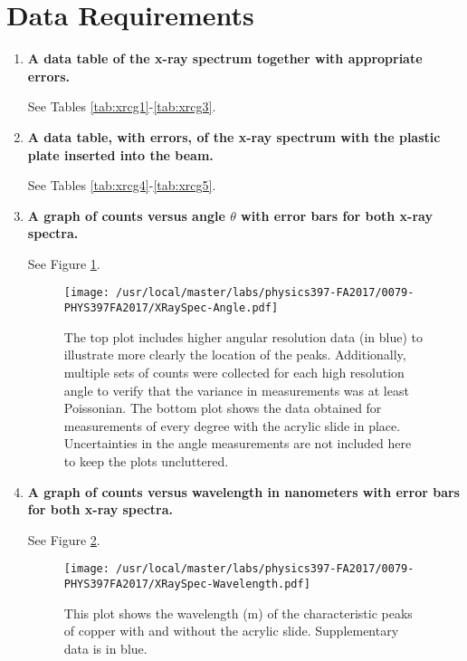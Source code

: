 \section{Data Requirements}
\begin{enumerate}

\item {\bf A data table of the x-ray spectrum together with appropriate errors.}\newline

See Tables \ref{tab:xrcg1}-\ref{tab:xrcg3}.

\item {\bf A data table, with errors, of the x-ray spectrum with the plastic plate inserted into the beam.}\newline

See Tables \ref{tab:xrcg4}-\ref{tab:xrcg5}.

\item {\bf A graph of counts versus angle $\theta$ with error bars for both x-ray spectra.}\newline

See Figure \ref{fig:xrcg1}.

\begin{figure}
\texttt{[image: /usr/local/master/labs/physics397-FA2017/0079-PHYS397FA2017/XRaySpec-Angle.pdf]}
\caption{The top plot includes higher angular resolution data (in blue) to illustrate more clearly the location of the peaks. Additionally, multiple sets of counts were collected for each high resolution angle to verify that the variance in measurements was at least Poissonian. The bottom plot shows the data obtained for measurements of every degree with the acrylic slide in place. Uncertainties in the angle measurements are not included here to keep the plots uncluttered.}
\label{fig:xrcg1}
\end{figure}

\item {\bf A graph of counts versus wavelength in nanometers with error bars for both x-ray spectra.}\newline

See Figure \ref{fig:xrcg2}.

\begin{figure}
\texttt{[image: /usr/local/master/labs/physics397-FA2017/0079-PHYS397FA2017/XRaySpec-Wavelength.pdf]}
\caption{This plot shows the wavelength (m) of the characteristic peaks of copper with and without the acrylic slide. Supplementary data is in blue.}
\label{fig:xrcg2}
\end{figure}


\end{enumerate}
